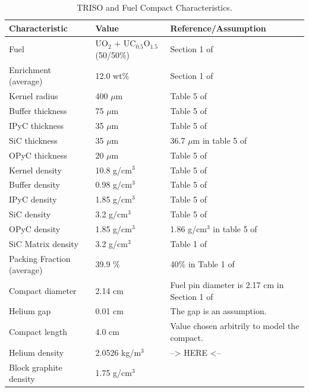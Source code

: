 \documentclass[11pt,letterpaper]{article}
\begin{document}
	\begin{table}[htbp!]
		\centering
	    \caption{TRISO and Fuel Compact Characteristics.}
	    \label{tab:compact}
		\begin{tabular}{l|l|l}
		\hline
		Characteristic              & Value             & Reference/Assumption \\ \hline
		Fuel                        & UO$_2$ + UC$_{0.5}$O$_{1.5}$ (50/50\%)  & Section 1 of \cite{hawari_development_2018} \\
		Enrichment (average)        & 12.0 wt\%         & Section 1 of \cite{hawari_development_2018}  \\
		Kernel radius               & 400 $\mu$m        & Table 5 of \cite{hawari_development_2018}  \\
		Buffer thickness            & 75 $\mu$m         & Table 5 of \cite{hawari_development_2018}  \\
		IPyC thickness              & 35 $\mu$m         & Table 5 of \cite{hawari_development_2018}  \\
		SiC thickness               & 35 $\mu$m         & 36.7 $\mu$m in table 5 of \cite{hawari_development_2018}  \\
		OPyC thickness              & 20 $\mu$m         & Table 5 of \cite{hawari_development_2018}  \\
    	Kernel density              & 10.8 g/cm$^3$     & Table 5 of \cite{hawari_development_2018}  \\
		Buffer density              & 0.98 g/cm$^3$     & Table 5 of \cite{hawari_development_2018}  \\
		IPyC density                & 1.85 g/cm$^3$     & Table 5 of \cite{hawari_development_2018}  \\
		SiC density                 & 3.2  g/cm$^3$     & Table 5 of \cite{hawari_development_2018}  \\
		OPyC density                & 1.85 g/cm$^3$     & 1.86 g/cm$^3$ in table 5 of \cite{hawari_development_2018}  \\
		SiC Matrix density          & 3.2 g/cm$^3$      & Table 1 of \cite{hawari_development_2018}  \\
		Packing Fraction (average)  & 39.9 \%           & 40\% in Table 1 of \cite{hawari_development_2018}  \\
		Compact diameter            & 2.14 cm           & Fuel pin diameter is 2.17 cm in Section 1 of \cite{hawari_development_2018}  \\
		Helium gap                  & 0.01 cm           & The gap is an assumption. \\
		Compact length              & 4.0 cm            & Value chosen arbitrily to model the compact. \\ 
        Helium density           	& 2.0526 kg/m$^3$   & --> HERE <--  \\
        Block graphite density      & 1.75 g/cm$^3$     &   \\ \hline

		\end{tabular}
	\end{table}
\end{document}

